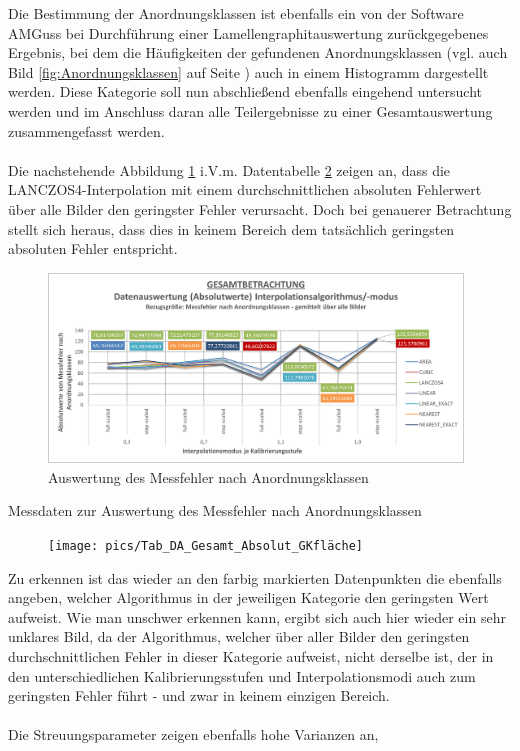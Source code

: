 \documentclass[
fontsize=10pt, 
listof = totoc,
parskip = half	
]{report}
\begin{document}
Die Bestimmung der Anordnungsklassen ist ebenfalls ein von der Software AMGuss bei Durchführung einer Lamellengraphitauswertung zurückgegebenes Ergebnis, bei dem die Häufigkeiten der gefundenen Anordnungsklassen (vgl. auch Bild \ref{fig:Anordnungsklassen} auf Seite \pageref{fig:Anordnungsklassen}) auch in einem Histogramm dargestellt werden.  Diese Kategorie soll nun abschließend ebenfalls eingehend untersucht werden und im Anschluss daran alle Teilergebnisse zu einer Gesamtauswertung zusammengefasst werden.
\\\\
\noindent Die nachstehende Abbildung \ref{fig:DAGesamtAbsolutAKL} i.V.m. Datentabelle \ref{tab:DAGesamtAbsolutAKL} zeigen an, dass die LANCZOS4-Interpolation mit einem durchschnittlichen absoluten Fehlerwert über alle Bilder den geringster Fehler verursacht. Doch bei genauerer Betrachtung stellt sich heraus, dass dies in keinem Bereich dem tatsächlich geringsten absoluten Fehler entspricht. 

\begin{figure}[H]
	\centering
	\includegraphics[width=11cm, height=\textheight, keepaspectratio]{pics/DA_Gesamt_Absolut_AKL}
	\caption{Auswertung des Messfehler nach Anordnungsklassen}
	\label{fig:DAGesamtAbsolutAKL}
\end{figure}

\begin{table}[H]
	\caption{Messdaten zur Auswertung des Messfehler nach Anordnungsklassen}
	\begin{figure}[H]
		\centering
		\texttt{[image: pics/Tab\_DA\_Gesamt\_Absolut\_GKfläche]}
		\label{tab:DAGesamtAbsolutAKL}
	\end{figure}
\end{table}

Zu erkennen ist das wieder an den farbig markierten Datenpunkten die ebenfalls angeben, welcher Algorithmus in der jeweiligen Kategorie den geringsten Wert aufweist. Wie man unschwer erkennen kann, ergibt sich auch hier wieder ein sehr unklares Bild, da der Algorithmus, welcher über aller Bilder den geringsten durchschnittlichen Fehler in dieser Kategorie aufweist, nicht derselbe ist, der in den unterschiedlichen Kalibrierungsstufen und Interpolationsmodi auch zum geringsten Fehler führt - und zwar in keinem einzigen Bereich.
\\\\
Die Streuungsparameter zeigen ebenfalls hohe Varianzen an, 
\end{document}
